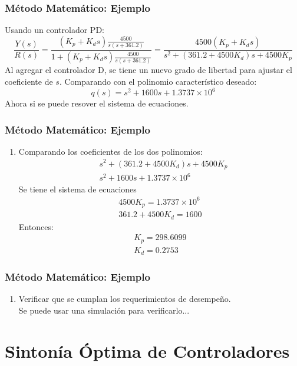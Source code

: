 \documentclass[aspectratio=169]{beamer}
\theoremstyle{definition}
\theoremstyle{plain}
\theoremstyle{remark}
\newcounter{saveenumi}
\newcommand{\seti}{\setcounter{saveenumi}{\value{enumi}}}
\newcommand{\conti}{\setcounter{enumi}{\value{saveenumi}}}
\begin{document}
\begin{frame}[<+->]\frametitle{Método Matemático: Ejemplo}
	Usando un controlador PD:
	\begin{equation*}
		\frac{Y(s)}{R(s)} = \frac{(K_p + K_ds)\frac{4500}{s(s+361.2)}}{1 + (K_p + K_ds)\frac{4500}{s(s+361.2)}} = \frac{4500 (K_p + K_ds)}{s^2 + (361.2+4500K_d)s + 4500K_p}
	\end{equation*}
	Al agregar el controlador D, se tiene un nuevo grado de libertad para ajustar el coeficiente de $s$. Comparando con el polinomio característico deseado:
	\begin{equation*}
		q(s) = s^2 + 1600s + 1.3737\times 10^6
	\end{equation*}
	Ahora si se puede resover el sistema de ecuaciones.
\end{frame}

\begin{frame}[<+->]\frametitle{Método Matemático: Ejemplo}
\begin{enumerate}
	\conti
	\item Comparando los coeficientes de los dos polinomios:
	\begin{align*}
		&s^2 + (361.2+4500K_d)s + 4500K_p\\
		&s^2 + 1600s +1.3737\times 10^6
	\end{align*}
	Se tiene el sistema de ecuaciones
	\begin{align*}
		4500K_p = 1.3737\times 10^6\\
		361.2+4500K_d = 1600
	\end{align*}
	Entonces:
	\begin{align*}
		K_p = 298.6099\\
		K_d = 0.2753
	\end{align*}
	\seti
\end{enumerate}
\end{frame}

\begin{frame}[<+->]\frametitle{Método Matemático: Ejemplo}
	\begin{enumerate}
		\conti
		\item Verificar que se cumplan los requerimientos de desempeño.\\
		\vspace*{5mm}
		Se puede usar una simulación para verificarlo...
	\end{enumerate}
\end{frame}

\section{Sintonía Óptima de Controladores}
\end{document}
